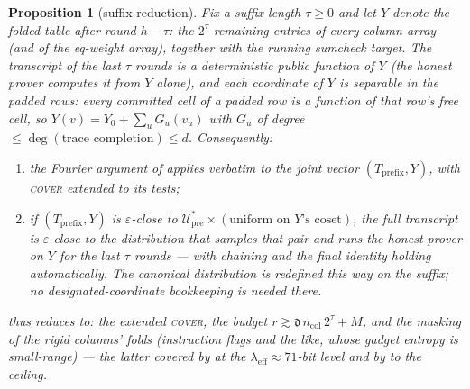 \documentclass{article}
\newcommand{\extdeg}{\mathfrak{d}}
\newtheorem{proposition}[theorem]{Proposition}
\theoremstyle{definition}
\begin{document}
\begin{proposition}[suffix reduction]\label{prop:suffix}
Fix a suffix length $\tau \geq 0$ and let $Y$ denote the \emph{folded table} after round $h - \tau$: the $2^\tau$ remaining entries of every column array (and of the eq-weight array), together with the running sumcheck target. The transcript of the last $\tau$ rounds is a deterministic public function of $Y$ (the honest prover computes it from $Y$ alone), and each coordinate of $Y$ is \emph{separable} in the padded rows: every committed cell of a padded row is a function of that row's free cell, so $Y(v) = Y_0 + \sum_u G_u(v_u)$ with $G_u$ of degree $\leq \deg(\text{trace completion}) \leq d$. Consequently:
\begin{enumerate}
    \item the Fourier argument of  applies verbatim to the \emph{joint} vector $(T_{\mathrm{prefix}}, Y)$, with \textsc{cover} extended to its tests;
    \item if $(T_{\mathrm{prefix}}, Y)$ is $\varepsilon$-close to $\mathcal{U}^*_{\mathrm{pre}} \times (\text{uniform on } Y\text{'s coset})$, the \emph{full} transcript is $\varepsilon$-close to the distribution that samples that pair and runs the honest prover on $Y$ for the last $\tau$ rounds --- with chaining and the final identity holding automatically. The canonical distribution is redefined this way on the suffix; no designated-coordinate bookkeeping is needed there.
\end{enumerate}
 thus \emph{reduces} to: the extended \textsc{cover}, the budget $r \gtrsim \extdeg\, n_{\mathrm{col}}\, 2^\tau + M$, and the masking of the \emph{rigid} columns' folds (instruction flags and the like, whose gadget entropy is small-range) --- the latter covered by  at the $\lambda_{\mathrm{eff}} \approx 71$-bit level and by  to the ceiling.
\end{proposition}
\end{document}

